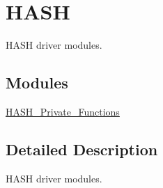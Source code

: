 \hypertarget{group___h_a_s_h}{\section{H\-A\-S\-H}
\label{group___h_a_s_h}
}


H\-A\-S\-H driver modules.  


\subsection*{Modules}
\begin{DoxyCompactItemize}
\item 
\hyperlink{group___h_a_s_h___private___functions}{H\-A\-S\-H\-\_\-\-Private\-\_\-\-Functions}
\end{DoxyCompactItemize}


\subsection{Detailed Description}
H\-A\-S\-H driver modules. 